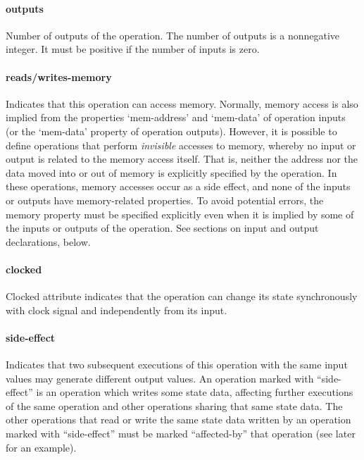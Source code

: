 \documentclass[a4paper,twoside]{tceusermanual}
\begin{document}
\paragraph{outputs}

Number of outputs of the operation. The number of outputs is a
nonnegative integer. It must be positive if the number of inputs is
zero.

\paragraph{reads/writes-memory}

Indicates that this operation can access memory.  Normally, memory access is
also implied from the properties `mem-address' and `mem-data' of operation
inputs (or the `mem-data' property of operation outputs).  However, it is
possible to define operations that perform \emph{invisible} accesses to
memory, whereby no input or output is related to the memory access itself.
That is, neither the address nor the data moved into or out of memory is
explicitly specified by the operation.  In these operations, memory accesses
occur as a side effect, and none of the inputs or outputs have
memory-related properties.  To avoid potential errors, the memory property
must be specified explicitly even when it is implied by some of the inputs
or outputs of the operation.  See sections on input and output declarations,
below.

\paragraph{clocked}
Clocked attribute indicates that the operation can change its state
synchronously with clock signal and independently from its input.

\paragraph{side-effect}

Indicates that two subsequent executions of this operation with the same
input values may generate different output values.  An operation marked with
``side-effect'' is an operation which writes some state data, affecting
further executions of the same operation and other operations sharing
that same state data. The other operations that read or write
the same state data written by an operation marked with ``side-effect'' 
must be marked ``affected-by'' that operation (see later for an example).
\end{document}
